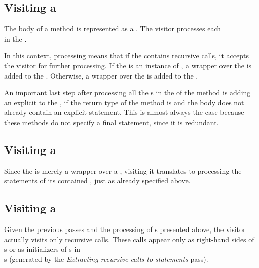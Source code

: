 \subsection{Visiting a }

The body of a method is represented as a . The visitor processes each\\
 in the .

In this context, processing means that if the  contains recursive calls, it
accepts the visitor for further processing. If the  is an instance of , a
 wrapper over the  is added to the . Otherwise, a
 wrapper over the  is added to the .

An important last step after processing all the s in the  of the method is adding
an explicit  to the , if the return type of the method is  and the
body does not already contain an explicit  statement. This is almost always the case because these methods
do not specify a final  statement, since it is redundant.

\subsection{Visiting a }
Since the  is merely a wrapper over a , visiting it translates to processing
the statements of its contained , just as already specified above.

\subsection{Visiting a }

Given the previous passes and the processing of s presented above, the visitor actually visits only
recursive calls. These calls appear only as right-hand sides of\\
s or as initializers of s in\\
s (generated by the \textit{Extracting recursive calls to statements} pass).

